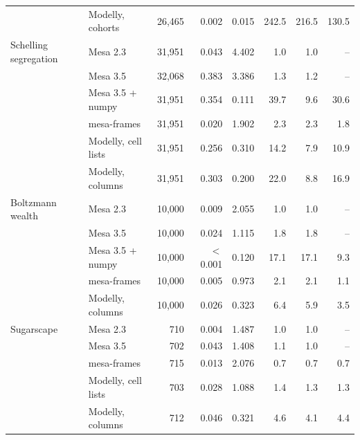 \begin{tabular}{llrrrrrr}
 & Modelly, cohorts & 26{,}465 & 0.002 & 0.015 & 242.5 & 216.5 & 130.5 \\
\addlinespace
Schelling segregation & Mesa 2.3 & 31{,}951 & 0.043 & 4.402 & 1.0 & 1.0 & -- \\
 & Mesa 3.5 & 32{,}068 & 0.383 & 3.386 & 1.3 & 1.2 & -- \\
 & Mesa 3.5 + numpy & 31{,}951 & 0.354 & 0.111 & 39.7 & 9.6 & 30.6 \\
 & mesa-frames & 31{,}951 & 0.020 & 1.902 & 2.3 & 2.3 & 1.8 \\
 & Modelly, cell lists & 31{,}951 & 0.256 & 0.310 & 14.2 & 7.9 & 10.9 \\
 & Modelly, columns & 31{,}951 & 0.303 & 0.200 & 22.0 & 8.8 & 16.9 \\
\addlinespace
Boltzmann wealth & Mesa 2.3 & 10{,}000 & 0.009 & 2.055 & 1.0 & 1.0 & -- \\
 & Mesa 3.5 & 10{,}000 & 0.024 & 1.115 & 1.8 & 1.8 & -- \\
 & Mesa 3.5 + numpy & 10{,}000 & $<$0.001 & 0.120 & 17.1 & 17.1 & 9.3 \\
 & mesa-frames & 10{,}000 & 0.005 & 0.973 & 2.1 & 2.1 & 1.1 \\
 & Modelly, columns & 10{,}000 & 0.026 & 0.323 & 6.4 & 5.9 & 3.5 \\
\addlinespace
Sugarscape & Mesa 2.3 & 710 & 0.004 & 1.487 & 1.0 & 1.0 & -- \\
 & Mesa 3.5 & 702 & 0.043 & 1.408 & 1.1 & 1.0 & -- \\
 & mesa-frames & 715 & 0.013 & 2.076 & 0.7 & 0.7 & 0.7 \\
 & Modelly, cell lists & 703 & 0.028 & 1.088 & 1.4 & 1.3 & 1.3 \\
 & Modelly, columns & 712 & 0.046 & 0.321 & 4.6 & 4.1 & 4.4 \\
\bottomrule
\end{tabular}
